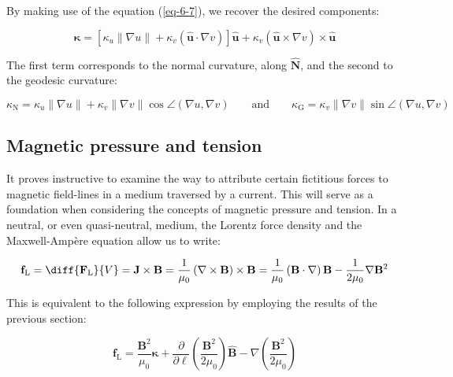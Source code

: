 By making use of the equation (\ref{eq-6-7}), we recover the desired components:

\begin{equation}
    \boldsymbol{\kappa}=\left[\kappa_u\|\nabla u\|+\kappa_v(\mathbf{\hat{u}}\cdot\nabla v)\right]\mathbf{\hat{u}}+\kappa_v(\mathbf{\hat{u}}\times\nabla v)\times\mathbf{\hat{u}}
\end{equation}

The first term corresponds to the normal curvature, along $\mathbf{\hat{N}}$, and the second to the geodesic curvature:

\begin{equation}
    \kappa_\text{N}=\kappa_u\|\nabla u\|+\kappa_v\|\nabla v\|\cos{\angle\left(\nabla u,\nabla v\right)}\quad\quad\text{and}\quad\quad\kappa_\text{G}=\kappa_v\|\nabla v\|\sin{\angle\left(\nabla u,\nabla v\right)}
\end{equation}

\subsection{Magnetic pressure and tension}

\label{subsec-magnetic-tensionandpressure}

It proves instructive to examine the way to attribute certain fictitious forces to magnetic field-lines in a medium traversed by a current. This will serve as a foundation when considering the concepts of magnetic pressure and tension. In a neutral, or even quasi-neutral, medium, the Lorentz force density and the Maxwell-Ampère equation allow us to write:

\begin{equation}
    \label{eq-5-11}
    \mathbf{f}_\text{L}=\diff{\mathbf{F}_\text{L}}{V}=\mathbf{J}\times\mathbf{B}=\frac{1}{\mu_0}\left(\nabla\times\mathbf{B}\right)\times\mathbf{B}=\frac{1}{\mu_0}\left(\mathbf{B}\cdot\nabla\right)\mathbf{B}-\frac{1}{2\mu_0}\nabla\mathbf{B}^2
\end{equation}

This is equivalent to the following expression by employing the results of the previous section:

\begin{equation}
    \mathbf{f}_\text{L}=\frac{\mathbf{B}^2}{\mu_0}\boldsymbol{\kappa}+\frac{\partial}{\partial\ell}\left(\frac{\mathbf{B}^2}{2\mu_0}\right)\mathbf{\hat{B}}-\nabla\left(\frac{\mathbf{B}^2}{2\mu_0}\right)
\end{equation}

